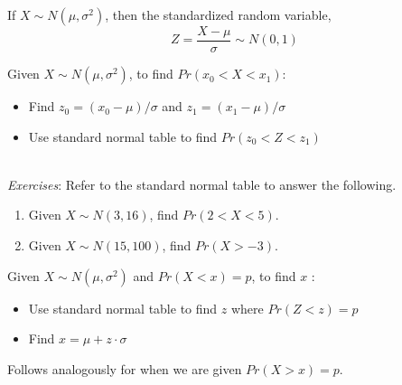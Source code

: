\documentclass{./../handout}
\begin{document}
\thispagestyle{plain}
\begin{center}
\end{center}	

If $X \sim N(\mu, \sigma^2)$, then the standardized random variable,
$$ Z = \frac{X-\mu}{\sigma} \sim N(0,1) $$

Given $X \sim N(\mu, \sigma^2)$, to find $Pr(x_0<X<x_1)$: \vspace{-1em}
\begin{itemize}
  \item Find $z_0 = (x_0-\mu)/\sigma$ and $z_1 = (x_1-\mu)/\sigma$
  \item Use standard normal table to find $Pr(z_0<Z<z_1)$ \\~\\
\end{itemize}

\textit{Exercises}: Refer to the standard normal table to answer the following.
\begin{enumerate}
  \item Given $X \sim N(3, 16)$, find $Pr(2<X<5)$. \vspace{4cm}
  \item Given $X \sim N(15, 100)$, find $Pr(X>-3)$. 
\end{enumerate}

\newpage
Given $X \sim N(\mu, \sigma^2)$ and $Pr(X<x)=p$, to find $x$ : \vspace{-1em}
\begin{itemize}
  \item Use standard normal table to find $z$ where $Pr(Z<z)=p$ 
  \item Find $x = \mu + z \cdot \sigma $  \vspace{-1em}
\end{itemize}
Follows analogously for when we are given $Pr(X>x)=p$. \\~\\ \vspace{-0.25cm}
\end{document}
